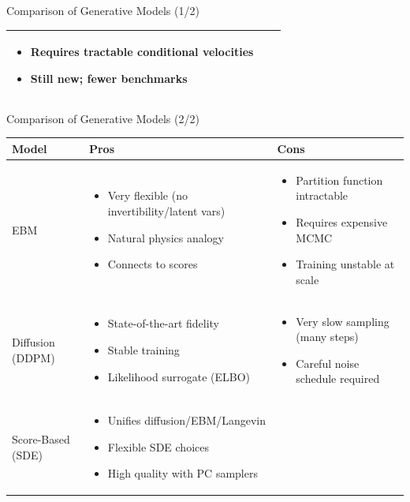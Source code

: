 \documentclass[xcolor=dvipsnames,aspectratio=169]{beamer}
\begin{document}
\begin{frame}{Comparison of Generative Models (1/2)}
\begin{tabularx}{\linewidth}{@{} l X X @{}}
                \begin{itemize}\item Requires tractable conditional velocities \item Still new; fewer benchmarks \end{itemize} \\
                \bottomrule
            \end{tabularx}
        \end{frame}

        \begin{frame}{Comparison of Generative Models (2/2)}
            \tiny
            \renewcommand{\arraystretch}{1.3}
            \begin{tabularx}{\linewidth}{@{} l X X @{}}
                \toprule
                \textbf{Model} & \textbf{Pros} & \textbf{Cons} \\ 
                \midrule
                EBM &
                \begin{itemize}\item Very flexible (no invertibility/latent vars) \item Natural physics analogy \item Connects to scores \end{itemize} &
                \begin{itemize}\item Partition function intractable \item Requires expensive MCMC \item Training unstable at scale \end{itemize} \\
                Diffusion (DDPM) &
                \begin{itemize}\item State-of-the-art fidelity \item Stable training \item Likelihood surrogate (ELBO) \end{itemize} &
                \begin{itemize}\item Very slow sampling (many steps) \item Careful noise schedule required \end{itemize} \\
                Score-Based (SDE) &
                \begin{itemize}\item Unifies diffusion/EBM/Langevin \item Flexible SDE choices \item High quality with PC samplers \end{itemize} &

\end{tabularx}
\end{frame}
\end{document}
